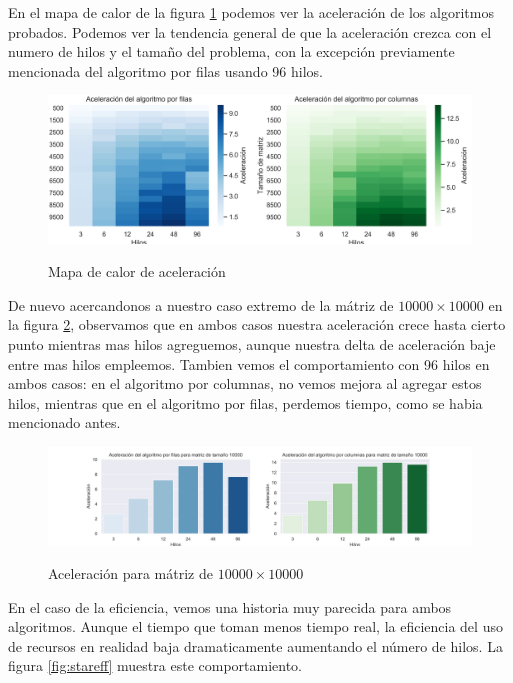 \documentclass{report}
\begin{document}
En el mapa de calor de la figura \ref{fig:staraccel} podemos ver la aceleración de
los algoritmos probados. Podemos ver la tendencia general de que la aceleración
crezca con el numero de hilos y el tamaño del problema, con la excepción previamente
mencionada del algoritmo por filas usando 96 hilos.

\begin{figure}[H]
    \centering
  \caption{Mapa de calor de aceleración}
\includegraphics[width=\textwidth]{stars_accel}
\label{fig:staraccel}
\end{figure}

De nuevo acercandonos a nuestro caso extremo de la mátriz de $10000 \times 10000$ en
la figura \ref{fig:staraccelbar}, observamos que en ambos casos nuestra aceleración
crece hasta cierto punto mientras mas hilos agreguemos, aunque nuestra delta de
aceleración baje entre mas hilos empleemos. Tambien vemos el comportamiento con 96
hilos en ambos casos: en el algoritmo por columnas, no vemos mejora al agregar estos
hilos, mientras que en el algoritmo por filas, perdemos tiempo, como se habia
mencionado antes.

\begin{figure}[H]
    \centering
  \caption{Aceleración para mátriz de $10000 \times 10000$}
\includegraphics[width=\textwidth]{stars_accel_bar}
\label{fig:staraccelbar}
\end{figure}

En el caso de la eficiencia, vemos una historia muy parecida para ambos algoritmos.
Aunque el tiempo que toman menos tiempo real, la eficiencia del uso de recursos
en realidad baja dramaticamente aumentando el número de hilos. La figura
\ref{fig:stareff} muestra este comportamiento.
\end{document}
